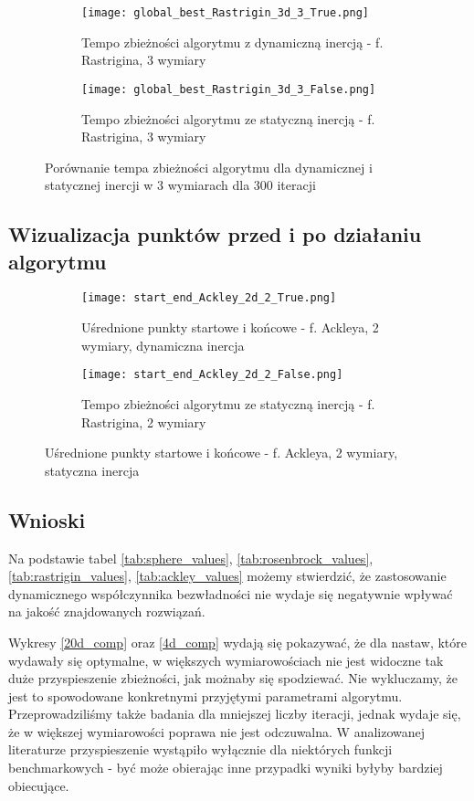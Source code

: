 \documentclass[12pt]{article}
\begin{document}
\begin{figure}[ht]
	\centering
	\begin{subfigure}{0.49\textwidth}
		\texttt{[image: global\_best\_Rastrigin\_3d\_3\_True.png]}
		\caption{Tempo zbieżności algorytmu z dynamiczną inercją - f. Rastrigina, 3 wymiary}
	\end{subfigure}
	\hfill
	\begin{subfigure}{0.49\textwidth}
		\texttt{[image: global\_best\_Rastrigin\_3d\_3\_False.png]}
		\caption{Tempo zbieżności algorytmu ze statyczną inercją - f. Rastrigina, 3 wymiary}
	\end{subfigure}
	\caption{Porównanie tempa zbieżności algorytmu dla dynamicznej i statycznej inercji w 3 wymiarach dla 300 iteracji}
	\label{3d_comp}
\end{figure}

\pagebreak
\FloatBarrier


\subsection*{Wizualizacja punktów przed i po działaniu algorytmu}

\begin{figure}[h!]
	\centering
	\begin{subfigure}{0.49\textwidth}
		\texttt{[image: start\_end\_Ackley\_2d\_2\_True.png]}
		\caption{Uśrednione punkty startowe i końcowe - f. Ackleya, 2 wymiary, dynamiczna inercja}
	\end{subfigure}
	\hfill
	\begin{subfigure}{0.49\textwidth}
		\texttt{[image: start\_end\_Ackley\_2d\_2\_False.png]}
		\caption{Tempo zbieżności algorytmu ze statyczną inercją - f. Rastrigina, 2 wymiary}
	\end{subfigure}
	\caption{Uśrednione punkty startowe i końcowe - f. Ackleya, 2 wymiary, statyczna inercja}
	\label{ackley_start_end}
\end{figure}

\subsection*{Wnioski}
Na podstawie tabel \ref{tab:sphere_values}, \ref{tab:rosenbrock_values}, \ref{tab:rastrigin_values}, \ref{tab:ackley_values} możemy stwierdzić, że
zastosowanie dynamicznego współczynnika bezwładności nie wydaje się negatywnie wpływać na jakość znajdowanych rozwiązań.

Wykresy \ref{20d_comp} oraz \ref{4d_comp} wydają się pokazywać, że dla nastaw, które wydawały się optymalne, w większych wymiarowościach nie jest widoczne tak duże
przyspieszenie zbieżności, jak możnaby się spodziewać. Nie wykluczamy, że jest to spowodowane konkretnymi przyjętymi parametrami algorytmu. Przeprowadziliśmy
także badania dla mniejszej liczby iteracji, jednak wydaje się, że w większej wymiarowości poprawa nie jest odczuwalna. W analizowanej literaturze przyspieszenie
wystąpiło wyłącznie dla niektórych funkcji benchmarkowych - być może obierając inne przypadki wyniki byłyby bardziej obiecujące.
\end{document}
